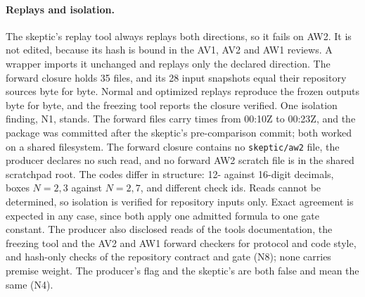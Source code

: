 \paragraph{Replays and isolation.}
The skeptic's replay tool always replays both directions, so it fails on
AW2.
It is not edited, because its hash is bound in the AV1, AV2 and AW1 reviews.
A wrapper imports it unchanged and replays only the declared direction. The
forward closure holds 35 files, and its 28 input snapshots equal their
repository sources byte for byte. Normal and optimized replays reproduce the
frozen outputs byte for byte, and the freezing tool reports the closure
verified. One isolation finding, N1, stands. The forward files carry times
from 00:10Z to 00:23Z, and the package was committed after the skeptic's
pre-comparison commit; both worked on a shared filesystem. The forward closure
contains no \texttt{skeptic/aw2} file, the producer declares no such read, and
no forward AW2 scratch file is in the shared scratchpad root. The codes differ
in structure: 12- against 16-digit decimals, boxes $N=2,3$ against $N=2,7$,
and different check ids. Reads cannot be determined, so isolation is verified
for repository inputs only. Exact agreement is expected in any case, since
both apply one admitted formula to one gate constant. The producer also
disclosed reads of the tools documentation, the freezing tool and the AV2 and
AW1 forward checkers for protocol and code style, and hash-only checks of the
repository contract and gate (N8); none carries premise weight. The producer's
flag  and the skeptic's
 are both false and mean the same
(N4).

